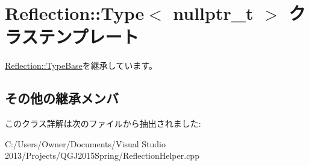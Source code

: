 \hypertarget{class_reflection_1_1_type_3_01nullptr__t_01_4}{}\section{Reflection\+:\+:Type$<$ nullptr\+\_\+t $>$ クラステンプレート}
\label{class_reflection_1_1_type_3_01nullptr__t_01_4}


\hyperlink{class_reflection_1_1_type_base}{Reflection\+::\+Type\+Base}を継承しています。

\subsection*{その他の継承メンバ}


このクラス詳解は次のファイルから抽出されました\+:\begin{DoxyCompactItemize}
\item 
C\+:/\+Users/\+Owner/\+Documents/\+Visual Studio 2013/\+Projects/\+Q\+G\+J2015\+Spring/Reflection\+Helper.\+cpp\end{DoxyCompactItemize}
